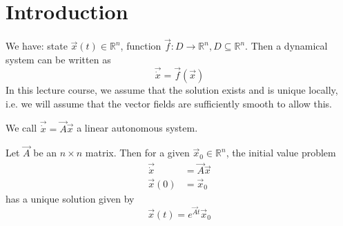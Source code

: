 \section{Introduction}
We have: state $\vec x(t) \in \mathbb R^n$, function $\vec f: D \to \mathbb R^n, D \subseteq \mathbb R^n$. Then a dynamical system can be written as
\begin{equation}
	\vec{\dot x} = \vec f(\vec x)
\end{equation}
In this lecture course, we assume that the solution exists and is unique locally, i.e. we will assume that the vector fields are sufficiently smooth to allow this.

We call $\vec{\dot x} = \vec A \vec x$ a linear autonomous system.
\begin{theorem} %
	\label{thm:lec1:linear}
	Let $\vec A$ be an $n \times n$ matrix. Then for a given $\vec x_0 \in \mathbb R^n$, the initial value problem
	\begin{align}
		\vec{\dot x} 	&= \vec A \vec x \\
		\vec x(0)		&= \vec x_0
	\end{align}
	has a unique solution given by
	\begin{equation}
		\vec x(t) = e^{\vec At} \vec x_0
	\end{equation}
\end{theorem}